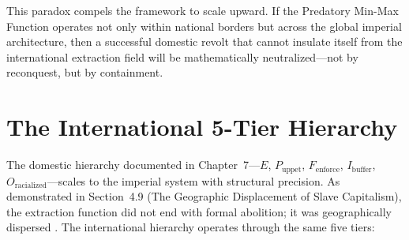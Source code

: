 \documentclass[12pt,openany]{book}
\begin{document}
This paradox compels the framework to scale upward. If the Predatory Min-Max Function operates not only within national borders but across the global imperial architecture, then a successful domestic revolt that cannot insulate itself from the international extraction field will be mathematically neutralized---not by reconquest, but by containment.

\section{The International 5-Tier Hierarchy}

The domestic hierarchy documented in Chapter~7---$E$, $P_{\text{uppet}}$, $F_{\text{enforce}}$, $I_{\text{buffer}}$, $O_{\text{racialized}}$---scales to the imperial system with structural precision. As demonstrated in Section~4.9 (The Geographic Displacement of Slave Capitalism), the extraction function did not end with formal abolition; it was geographically dispersed \cite{rodney, pigeaud}. The international hierarchy operates through the same five tiers:
\end{document}
